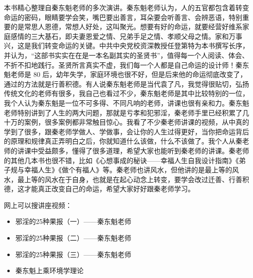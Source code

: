 \begin{book}
    本书精心整理自秦东魁老师的多次演讲。秦东魁老师认为，人的五官都包含着转变命运的密码，眼睛要学会笑，嘴巴要出善言，耳朵要会听善言、会辨恶语，特别重要的是常思人恩德，常想人好处，这叫聚光。想要有好的命运，就要经营好维系家庭感情的三大基石，即夫妻恩爱之情、兄弟手足之情、孝顺父母之情。家和万事兴，这是我们转变命运的关键。中共中央党校资深教授任登第特为本书撰写长序，并认为，“这部书实实在在是一本名副其实的圣贤书”，值得每一个人阅读、体会、不折不扣地践行。圣贤所言真实不虚，我们每一个人都是自己命运的设计师！秦东魁老师是 80 后，幼年失学，家庭环境也很不好，但是后来他的命运彻底改变了，通过的方法就是行善积德。有人说秦东魁老师是当代袁了凡，我觉得很贴切，弘扬传统文化的老师有很多，我自己也看过不少，秦东魁老师是其中比较特别的一位，我个人认为秦东魁是一位不可多得、不同凡响的老师，讲课也很有亲和力。秦东魁老师特别讲到了人生的两大问题，那就是亏孝和犯邪淫，秦老师手里已经积累了几十万的案例，很多案例都非常触目惊心。我看了不少秦老师讲课的视频，从中真的学到了很多，跟秦老师学做人、学做事，会让你的人生过得更好，当你把命运背后的原理和规律真正弄明白之后，你就知道什么该做，什么不该做了。我个人从秦老师的讲课中受益颇多，懂得了很多道理，希望大家也能听到秦老师的讲课。秦老师的其他几本书也很不错，比如《心想事成的秘诀——幸福人生自我设计指南》《弟子规与幸福人生》《做个有福人》等。秦老师也讲风水，但他讲的是最上等的风水，最上等的风水在于自身，也就是在起心动念上转变，要学会改过迁善、行善积德，这才能真正改变自己的命运，希望大家好好跟秦老师学习。

    网上可以搜讲座视频：\begin{itemize}
        \item 邪淫的25种果报（一）——秦东魁老师
        \item 邪淫的25种果报（二）——秦东魁老师
        \item 邪淫的25种果报（三）——秦东魁老师
        \item 秦东魁上乘环境学理论
    \end{itemize}
\end{book}

